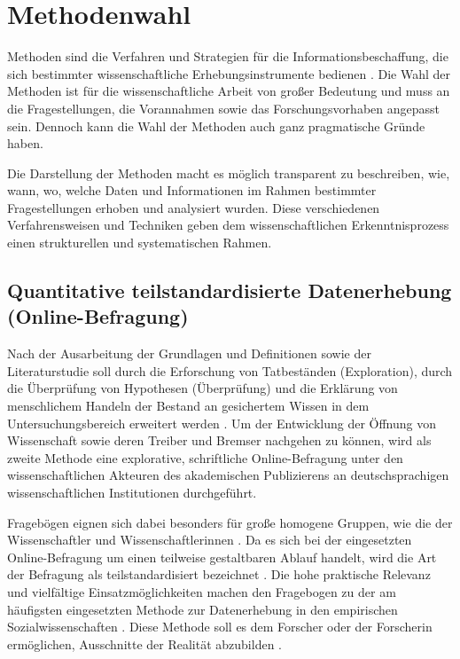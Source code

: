 \section{Methodenwahl}

Methoden sind die Verfahren und Strategien für die Informationsbeschaffung, die sich bestimmter wissenschaftliche Erhebungsinstrumente bedienen \cite[:309]{kromrey2013empirische}. Die Wahl der Methoden ist für die wissenschaftliche Arbeit von großer Bedeutung und muss an die Fragestellungen, die Vorannahmen sowie das Forschungsvorhaben angepasst sein. Dennoch kann die Wahl der Methoden auch ganz pragmatische Gründe haben.

Die Darstellung der Methoden macht es möglich transparent zu beschreiben, wie, wann, wo, welche Daten und Informationen im Rahmen bestimmter Fragestellungen erhoben und analysiert wurden. Diese verschiedenen Verfahrensweisen und Techniken geben dem wissenschaftlichen Erkenntnisprozess einen strukturellen und systematischen Rahmen.

\subsection{Quantitative teilstandardisierte Datenerhebung (Online-Befragung)}

Nach der Ausarbeitung der Grundlagen und Definitionen sowie der Literaturstudie soll durch die Erforschung von Tatbeständen (Exploration), durch die Überprüfung von Hypothesen (Überprüfung) \cite{raab_2012_fragebogen} und die Erklärung von menschlichem Handeln \cite{atteslander_2008_methoden} der Bestand an gesichertem Wissen in dem Untersuchungsbereich erweitert werden \cite{bortz_Doering_2006_fragestellung}. Um der Entwicklung der Öffnung von Wissenschaft sowie deren Treiber und Bremser nachgehen zu können, wird als zweite Methode eine explorative, schriftliche Online-Befragung unter den wissenschaftlichen Akteuren des akademischen Publizierens an deutschsprachigen wissenschaftlichen Institutionen durchgeführt.

Fragebögen eignen sich dabei besonders für große homogene Gruppen, wie die der Wissenschaftler und Wissenschaftlerinnen \cite{bortz_Doering_2006_fragestellung}. Da es sich bei der eingesetzten Online-Befragung um einen teilweise gestaltbaren Ablauf handelt, wird die Art der Befragung als teilstandardisiert bezeichnet \cite{raab_2012_fragebogen}. Die hohe praktische Relevanz und vielfältige Einsatzmöglichkeiten machen den Fragebogen zu der am häufigsten eingesetzten Methode zur Datenerhebung in den empirischen Sozialwissenschaften \cite{raab_2012_fragebogen}. Diese Methode soll es dem Forscher oder der Forscherin ermöglichen, Ausschnitte der Realität abzubilden \cite{raab_2012_fragebogen}.

